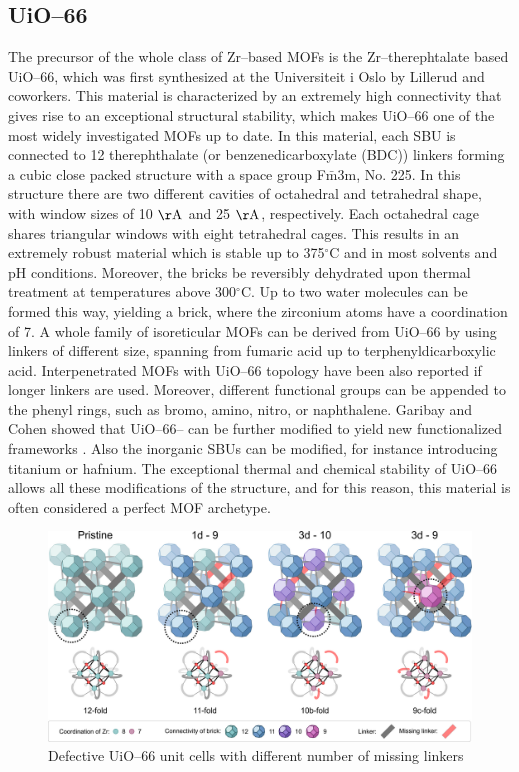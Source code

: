 \subsection*{UiO--66}
The precursor of the whole class of Zr--based MOFs is the Zr--therephtalate based UiO--66, which was first synthesized at the Universiteit i Oslo by Lillerud and coworkers\cite{cavka2008new}. This material is characterized by an extremely high connectivity that gives rise to an exceptional structural stability, which makes UiO--66 one of the most widely investigated MOFs up to date. In this material, each  SBU is connected to 12 therephthalate (or benzenedicarboxylate (BDC)) linkers forming a cubic close packed structure with a space group F$\bar{\mathrm{m}}$3m, No. 225. In this structure there are two different cavities of octahedral and tetrahedral shape, with window sizes of 10 $\mathrm{\AA}$ and 25 $\mathrm{\AA}$, respectively. Each octahedral cage shares triangular windows with eight tetrahedral cages. 
This results in an extremely robust material which is stable up to 375$^{\circ}$C and in most solvents and pH conditions. Moreover, the  bricks be reversibly dehydrated upon thermal treatment at temperatures above 300$^{\circ}$C. Up to two water molecules can be formed this way, yielding a  brick, where the zirconium atoms have a coordination of 7\cite{valenzano2011disclosing}. 
A whole family of isoreticular MOFs can be derived from UiO--66 by using linkers of different size, spanning from fumaric acid\cite{wissmann2012modulated} up to terphenyldicarboxylic acid\cite{schaate2011modulated}. Interpenetrated MOFs with UiO--66 topology have been also reported if longer linkers are used\cite{schaate2011porous}. Moreover, different functional groups can be appended to the phenyl rings, such as bromo, amino, nitro, or naphthalene. Garibay and Cohen showed that UiO--66-- can be further modified to yield new functionalized frameworks \cite{garibay2010isoreticular}. Also the inorganic SBUs can be modified, for instance introducing 
titanium or hafnium\cite{kim2012postsynthetic}. The exceptional thermal and chemical stability of UiO--66 allows all these modifications of the structure, and for this reason, this material is often considered a perfect MOF archetype. 

\begin{figure}[!htbp]
	\centering
 	\includegraphics[width=1.0\textwidth]{defectivebricks}
	\caption{Defective UiO--66 unit cells with different number of missing linkers}
	\label{fig:defectivebricks}
\end{figure}

